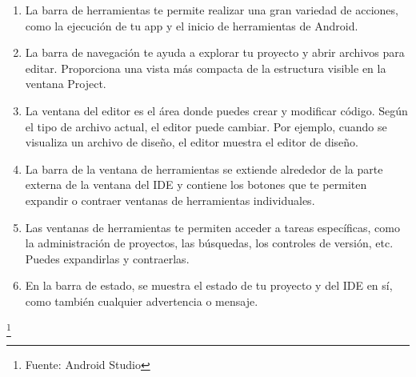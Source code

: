 \begin{enumerate}
\item La barra de herramientas te permite realizar una gran variedad de acciones, como la ejecución de tu app y el inicio de herramientas de Android.
\item La barra de navegación te ayuda a explorar tu proyecto y abrir archivos para editar. Proporciona una vista más compacta de la estructura visible en la ventana Project.
\item La ventana del editor es el área donde puedes crear y modificar código. Según el tipo de archivo actual, el editor puede cambiar. Por ejemplo, cuando se visualiza un archivo de diseño, el editor muestra el editor de diseño.
\item La barra de la ventana de herramientas se extiende alrededor de la parte externa de la ventana del IDE y contiene los botones que te permiten expandir o contraer ventanas de herramientas individuales.
\item Las ventanas de herramientas te permiten acceder a tareas específicas, como la administración de proyectos, las búsquedas, los controles de versión, etc. Puedes expandirlas y contraerlas.
\item En la barra de estado, se muestra el estado de tu proyecto y del IDE en sí, como también cualquier advertencia o mensaje.
\end{enumerate}
\footnote{Fuente: Android Studio\cite{ANDROIDSTUDIO}}